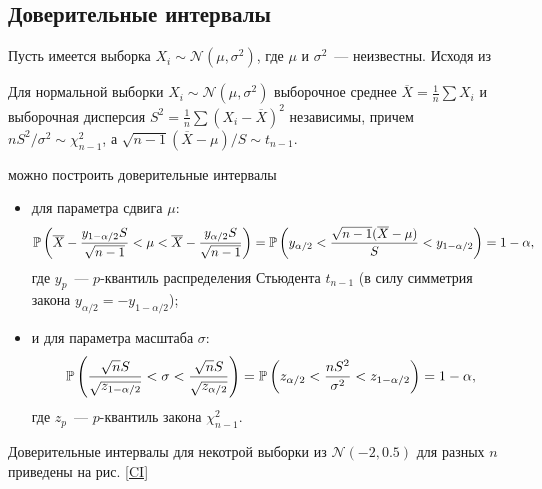 \subsection{Доверительные интервалы}
	Пусть имеется выборка $X_i \sim \mathcal{N}(\mu, \sigma^2)$, где $\mu$ и 
	$\sigma^2$~--- неизвестны. Исходя из
	\begin{theorem} Для нормальной выборки $X_i \sim \mathcal{N}(\mu, \sigma^2)$
	выборочное среднее $\overline X = \frac{1}{n}\sum X_i$ и выборочная 
	дисперсия $S^2 = \frac{1}{n}\sum (X_i-\overline X)^2$ независимы, причем 
	$nS^2/\sigma^2 \sim \chi_{n-1}^2$, а $\sqrt{n-1}(\overline X - \mu)/S 
	\sim t_{n-1}$.
	\end{theorem}
	можно построить доверительные интервалы 
	\begin{itemize}
		\item для параметра сдвига $\mu$:
		\[\mathbb{P}\left(\overline X - \frac{y_{1-\alpha/2}S}{\sqrt{n-1}} < \mu < 
		\overline X - \frac{y_{\alpha/2}S}{\sqrt{n-1}}\right) = 
		\mathbb{P}\left(y_{\alpha/2} < \frac{\sqrt{n-1}(\overline X - \mu)}{S} < 
		y_{1-\alpha/2}\right) = 1-\alpha,\]
		где $y_p$~--- $p$-квантиль распределения Стьюдента $t_{n-1}$ (в силу 
		симметрия закона $y_{\alpha/2} = -y_{1-\alpha/2}$);
		\item и для параметра масштаба $\sigma$:
		\[\mathbb{P}\left(\frac{\sqrt{n}S}{\sqrt{z_{1-\alpha/2}}} < \sigma < 
		\frac{\sqrt{n}S}{\sqrt{z_{\alpha/2}}}\right) = \mathbb{P}\left(z_{\alpha/2} < 
		\frac{nS^2}{\sigma^2} < z_{1-\alpha/2}\right) = 1-\alpha,\]
		где $z_p$~--- $p$-квантиль закона $\chi_{n-1}^2$.
	\end{itemize}

	Доверительные интервалы для некотрой выборки из $\mathcal{N}(-2,0.5)$ для 
	разных $n$ приведены на рис. \ref{CI}	

